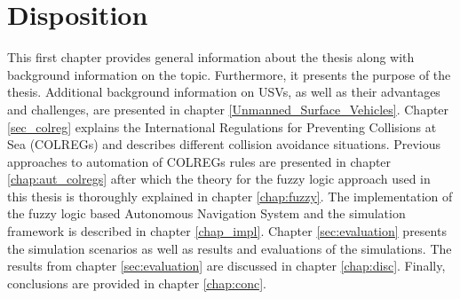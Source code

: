 \section{Disposition}
This first chapter  provides  general information about the thesis along with background information on the topic. Furthermore, it presents the purpose of the thesis. Additional background information on USVs, as well as their advantages and challenges, are presented in chapter \ref{Unmanned_Surface_Vehicles}. Chapter \ref{sec_colreg} explains the International Regulations for Preventing Collisions
at Sea (COLREGs) and describes different collision avoidance situations.  Previous approaches to automation of COLREGs rules are presented in chapter \ref{chap:aut_colregs} after which the theory for the fuzzy logic approach used in this thesis is thoroughly explained in chapter \ref{chap:fuzzy}. The implementation of the fuzzy logic based Autonomous Navigation System and the simulation framework is described in chapter \ref{chap_impl}. Chapter \ref{sec:evaluation} presents the simulation scenarios as well as results and evaluations of the simulations. The results from chapter \ref{sec:evaluation} are discussed in chapter \ref{chap:disc}. Finally, conclusions are provided in chapter \ref{chap:conc}.